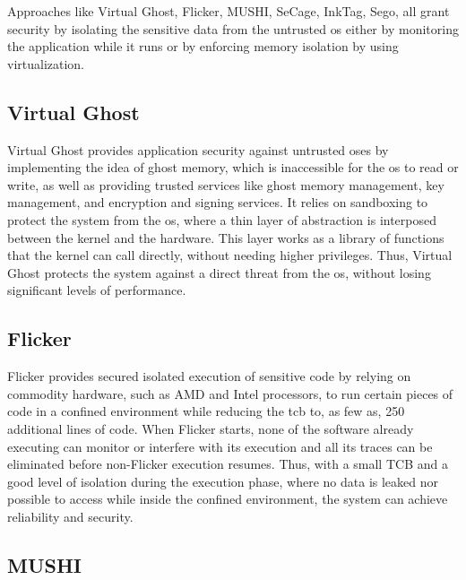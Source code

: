 Approaches like Virtual Ghost, Flicker, MUSHI, SeCage, InkTag, Sego, all grant security by isolating the sensitive data from the untrusted \gls{os} either by monitoring the application while it runs or by enforcing memory isolation by using virtualization.\newline

\subsection{Virtual Ghost} 

Virtual Ghost \cite{virtGhostPaper} provides application security against untrusted \gls{os}es by implementing the idea of ghost memory, which is inaccessible for the \gls{os} to read or write, as well as providing trusted services like ghost memory management, key management, and encryption and signing services. 
It relies on sandboxing to protect the system from the \gls{os}, where a thin layer of abstraction is interposed between the kernel and the hardware. This layer works as a library of functions that the kernel can call directly, without needing higher privileges. 
Thus, Virtual Ghost protects the system against a direct threat from the \gls{os}, without losing significant levels of performance.\newline


\subsection{Flicker} 

Flicker \cite{flickerPaper} provides secured isolated execution of sensitive code by relying on commodity hardware, such as AMD and Intel processors, to run certain pieces of code in a confined environment while reducing the \gls{tcb} to, as few as, 250 additional lines of code. 
When Flicker starts, none of the software already executing can monitor or interfere with its execution and all its traces can be eliminated before non-Flicker execution resumes. 
Thus, with a small TCB and a good level of isolation during the execution phase, where no data is leaked nor possible to access while inside the confined environment, the system can achieve reliability and security.\newline


\subsection{MUSHI} 

